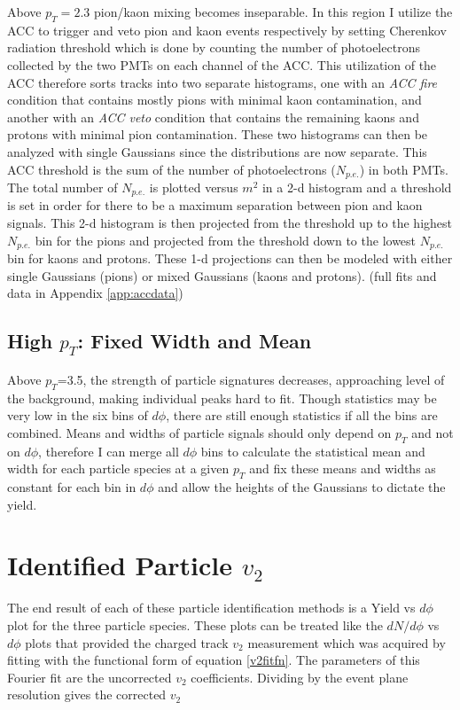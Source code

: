 Above $p_T=2.3$ pion/kaon mixing becomes inseparable. In this region I utilize the ACC to trigger and veto pion and kaon events respectively by setting Cherenkov radiation threshold which is done by counting the number of photoelectrons collected by the two PMTs on each channel of the ACC. This utilization of the ACC therefore sorts tracks into two separate histograms, one with an \textit{ACC fire} condition that contains mostly pions with minimal kaon contamination, and another with an \textit{ACC veto} condition that contains the remaining kaons and protons with minimal pion contamination. These two histograms can then be analyzed with single Gaussians since the distributions are now separate. This ACC threshold is the sum of the number of photoelectrons ($N_{p.e.}$) in both PMTs. The total number of $N_{p.e.}$ is plotted versus $m^2$ in a 2-d histogram and a threshold is set in order for there to be a maximum separation between pion and kaon signals. This 2-d histogram is then projected from the threshold up to the highest $N_{p.e.}$ bin for the pions and projected from the threshold down to the lowest $N_{p.e.}$ bin for kaons and protons. These 1-d projections can then be modeled with either single Gaussians (pions) or mixed Gaussians (kaons and protons). (full fits and data in Appendix \ref{app:accdata})

\subsection{High $p_T$: Fixed Width and Mean}
Above $p_T$=3.5, the strength of particle signatures decreases, approaching level of the background, making individual peaks hard to fit. Though statistics may be very low in the six bins of $d\phi$, there are still enough statistics if all the bins are combined. Means and widths of particle signals should only depend on $p_T$ and not on $d\phi$, therefore I can merge all $d\phi$ bins to calculate the statistical mean and width for each particle species at a given $p_T$ and fix these means and widths as constant for each bin in $d\phi$ and allow the heights of the Gaussians to dictate the yield.

\section{Identified Particle $v_{2}$}
The end result of each of these particle identification methods is a Yield vs $d\phi$ plot for the three particle species. These plots can be treated like the $dN/d\phi$ vs $d\phi$ plots that provided the charged track $v_2$ measurement which was acquired by fitting with the functional form of equation \ref{v2fitfn}. The parameters of this Fourier fit are the uncorrected $v_2$ coefficients. Dividing by the event plane resolution gives the corrected $v_2$

